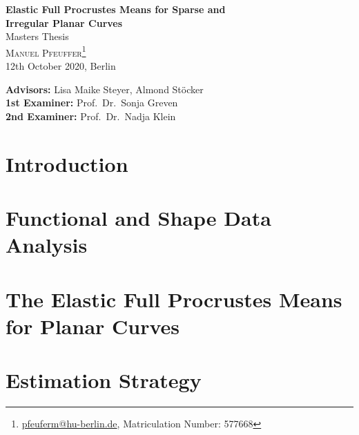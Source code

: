 \documentclass[a4paper,12pt,pagesize,DIV=calc,smallheadings,english]{article}
\theoremstyle{plain}
\begin{document}
\begin{titlepage}

  \vspace*{0.5cm}

  \begin{center}
    {\LARGE\textbf{Elastic Full Procrustes Means for Sparse and\vspace{0.4cm}\\
    Irregular Planar Curves}}
  \vspace{1cm}\\
    {\large Masters Thesis}
  \vspace{0.7cm}\\
  \textsc{Manuel Pfeuffer\footnote{\url{pfeuferm@hu-berlin.de}, Matriculation Number: 577668}}
  \vspace{0.1cm}\\
  12th October 2020, Berlin
  \vspace{1cm}\\

  \vfill
  \end{center}

  \noindent \textbf{Advisors:} Lisa Maike Steyer, Almond Stöcker\\
  \noindent \textbf{1st Examiner:} Prof.\ Dr.\ Sonja Greven\\
  \noindent \textbf{2nd Examiner:} Prof.\ Dr.\ Nadja Klein
  \vspace{0.5em}

\end{titlepage}


\tableofcontents
\newpage


\section{Introduction}
\label{sec:intro}


\section{Functional and Shape Data Analysis}
\label{sec:theo}


\section{The Elastic Full Procrustes Means for Planar Curves}
\label{sec:mean}


\section{Estimation Strategy}
\label{sec:algo}
\end{document}
